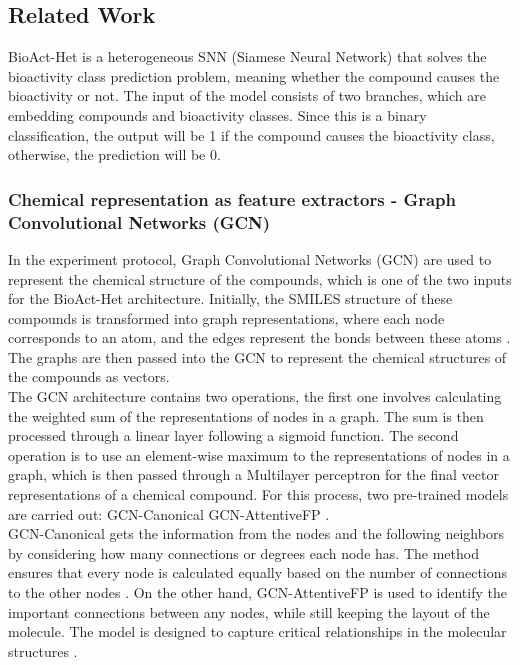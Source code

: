 \documentclass[conference]{IEEEtran}
\begin{document}
\subsection{Related Work}
BioAct-Het is a heterogeneous SNN (Siamese Neural Network) that solves the bioactivity class prediction problem, meaning whether the compound causes the bioactivity or not. The input of the model consists of two branches, which are embedding compounds and bioactivity classes. Since this is a binary classification, the output will be 1 if the compound causes the bioactivity class, otherwise, the prediction will be 0.\\

\subsubsection{Chemical representation as feature extractors - Graph Convolutional Networks (GCN)}
In the experiment protocol, Graph Convolutional Networks (GCN) are used to represent the chemical structure of the compounds, which is one of the two inputs for the BioAct-Het architecture. Initially, the SMILES structure of these compounds is transformed into graph representations, where each node corresponds to an atom, and the edges represent the bonds between these atoms \citet{Li}. The graphs are then passed into the GCN to represent the chemical structures of the compounds as vectors.\\

The GCN architecture contains two operations, the first one involves calculating the weighted sum of the representations of nodes in a graph. The sum is then processed through a linear layer following a sigmoid function. The second operation is to use an element-wise maximum to the representations of nodes in a graph, which is then passed through a Multilayer perceptron for the final vector representations of a chemical compound. For this process, two pre-trained models are carried out: GCN-Canonical GCN-AttentiveFP \citet{Heyrati}.\\

GCN-Canonical gets the information from the nodes and the following neighbors by considering how many connections or degrees each node has. The method ensures that every node is calculated equally based on the number of connections to the other nodes \citet{Kipf}. On the other hand, GCN-AttentiveFP is used to identify the important connections between any nodes, while still keeping the layout of the molecule. The model is designed to capture critical relationships in the molecular structures \citet{Xiong}.\\
\end{document}

